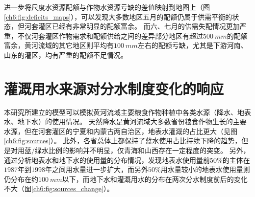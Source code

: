 进一步将尺度水资源配额与作物水资源亏缺的差值映射到地图上（图\ref{ch6:fig:deficits_maps}），可以发现大多数地区五月的配额仍属于供需平衡的状态，但河套灌区已经有非常明显的配额富余。
而六、七月的供需失配情况更加严重，不仅河套灌区作物需求和配额供给之间的差异部分地区有超过$500~mm$的配额富余，黄河流域的其它地区则平均有$100~mm$左右的配额亏缺，尤其是下游河南、山东的灌区，均有严重的配额不足情况。





\section{灌溉用水来源对分水制度变化的响应}

本研究所建立的模型可以模拟黄河流域主要粮食作物种植中各类水源（降水、地表水、地下水）的使用情况。
天然降水是黄河流域大多数省份粮食作物生长的主要水源，但在河套灌区的宁夏和内蒙古两自治区，地表水灌溉的占比更大（见图\ref{ch6:fig:sources}）。
此外，各省总体上都保持了蓝水使用占比持续下降的趋势，但是对用蓝/绿水比例的影响并不明显，仅青海和山西存在一定程度的突变。
另外，通过分析地表水和地下水的使用量的分布情况，发现地表水使用量前$50\%$的主体在$1987$年到$1998$年之间用水量进一步扩大，而另外$50\%$用水量较小的地表水使用量则仍分布在约$100~mm$以下，而地下水和灌溉用水的分布在两次分水制度前后的变化不大（图\ref{ch6:fig:sources_change}）。



